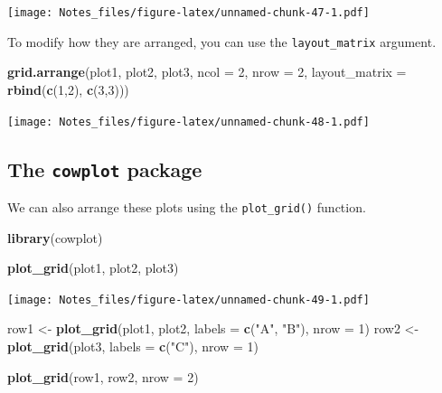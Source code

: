 \documentclass[
]{book}
\newenvironment{Shaded}{\begin{snugshade}}{\end{snugshade}}
\newcommand{\DataTypeTok}[1]{\textcolor[rgb]{0.13,0.29,0.53}{#1}}
\newcommand{\DecValTok}[1]{\textcolor[rgb]{0.00,0.00,0.81}{#1}}
\newcommand{\KeywordTok}[1]{\textcolor[rgb]{0.13,0.29,0.53}{\textbf{#1}}}
\newcommand{\NormalTok}[1]{#1}
\newcommand{\StringTok}[1]{\textcolor[rgb]{0.31,0.60,0.02}{#1}}
\begin{document}
\texttt{[image: Notes\_files/figure-latex/unnamed-chunk-47-1.pdf]}

To modify how they are arranged, you can use the \texttt{layout\_matrix} argument.

\begin{Shaded}
\begin{Highlighting}[]
\KeywordTok{grid.arrange}\NormalTok{(plot1, plot2, plot3, }\DataTypeTok{ncol =} \DecValTok{2}\NormalTok{, }\DataTypeTok{nrow =} \DecValTok{2}\NormalTok{, }
             \DataTypeTok{layout_matrix =} \KeywordTok{rbind}\NormalTok{(}\KeywordTok{c}\NormalTok{(}\DecValTok{1}\NormalTok{,}\DecValTok{2}\NormalTok{), }\KeywordTok{c}\NormalTok{(}\DecValTok{3}\NormalTok{,}\DecValTok{3}\NormalTok{)))}
\end{Highlighting}
\end{Shaded}

\texttt{[image: Notes\_files/figure-latex/unnamed-chunk-48-1.pdf]}

\hypertarget{the-cowplot-package}{%
\subsection*{\texorpdfstring{The \texttt{cowplot} package}{The cowplot package}}\label{the-cowplot-package}}

We can also arrange these plots using the \texttt{plot\_grid()} function.

\begin{Shaded}
\begin{Highlighting}[]
\KeywordTok{library}\NormalTok{(cowplot)}

\KeywordTok{plot_grid}\NormalTok{(plot1, plot2, plot3)}
\end{Highlighting}
\end{Shaded}

\texttt{[image: Notes\_files/figure-latex/unnamed-chunk-49-1.pdf]}

\begin{Shaded}
\begin{Highlighting}[]
\NormalTok{row1 <-}\StringTok{ }\KeywordTok{plot_grid}\NormalTok{(plot1, plot2, }\DataTypeTok{labels =} \KeywordTok{c}\NormalTok{(}\StringTok{"A"}\NormalTok{, }\StringTok{"B"}\NormalTok{), }\DataTypeTok{nrow =} \DecValTok{1}\NormalTok{)}
\NormalTok{row2 <-}\StringTok{ }\KeywordTok{plot_grid}\NormalTok{(plot3, }\DataTypeTok{labels =} \KeywordTok{c}\NormalTok{(}\StringTok{"C"}\NormalTok{), }\DataTypeTok{nrow =} \DecValTok{1}\NormalTok{)}

\KeywordTok{plot_grid}\NormalTok{(row1, row2, }\DataTypeTok{nrow =} \DecValTok{2}\NormalTok{)}
\end{Highlighting}
\end{Shaded}
\end{document}
